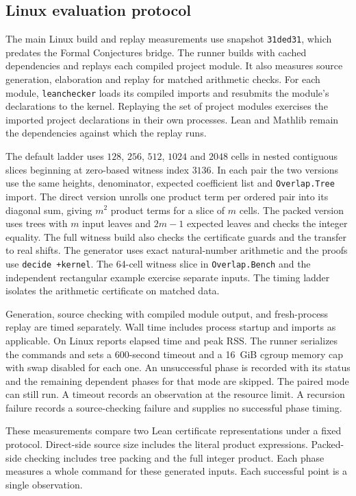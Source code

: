 \documentclass[sigplan,10pt,anonymous,review,balance=false]{acmart}
\newcommand{\leanid}[1]{\texttt{#1}}
\begin{document}
\subsection{Linux evaluation protocol}
\label{sec:measurements}

The main Linux build and replay measurements use snapshot \texttt{31ded31},
which predates the Formal Conjectures bridge. The runner builds with
cached dependencies and replays each compiled project module. It also measures source
generation, elaboration and replay for matched arithmetic checks.
For each module, \leanid{leanchecker} loads its compiled imports
and resubmits the module's declarations to the kernel.
Replaying the set of project modules exercises the imported
project declarations in their own processes. Lean and Mathlib
remain the dependencies against which the replay runs.

The default ladder uses $128$, $256$, $512$, $1024$ and $2048$
cells in nested contiguous slices beginning at zero-based witness
index $3136$. In each pair the two versions use the same
heights, denominator, expected coefficient list and
\leanid{Overlap.Tree} import. The direct version unrolls one
product term per ordered pair into its diagonal sum, giving
$m^2$ product terms for a slice of $m$ cells. The packed version
uses trees with $m$ input leaves and $2m-1$ expected leaves and
checks the integer equality. The full witness build also checks
the certificate guards and the transfer to real shifts. The
generator uses exact natural-number arithmetic and the proofs
use \leanid{decide +kernel}. The 64-cell witness slice in
\leanid{Overlap.Bench} and the independent rectangular example
exercise separate inputs. The timing ladder isolates the arithmetic
certificate on matched data.

Generation, source checking with compiled module output, and
fresh-process replay are timed separately. Wall time includes
process startup and imports as applicable. On Linux
 reports elapsed time and peak RSS. The
runner serializes the commands and sets a 600-second timeout and
a 16~GiB cgroup memory cap with swap disabled for each one.
An unsuccessful phase is recorded with its status and the
remaining dependent phases for that mode are skipped. The paired
mode can still run. A timeout records an observation at the
resource limit. A recursion failure records a source-checking
failure and supplies no successful phase timing.

These measurements compare two Lean certificate representations
under a fixed protocol. Direct-side source size includes the
literal product expressions. Packed-side checking includes tree
packing and the full integer product. Each phase
measures a whole command for these generated inputs. Each
successful point is a single observation.
\end{document}
